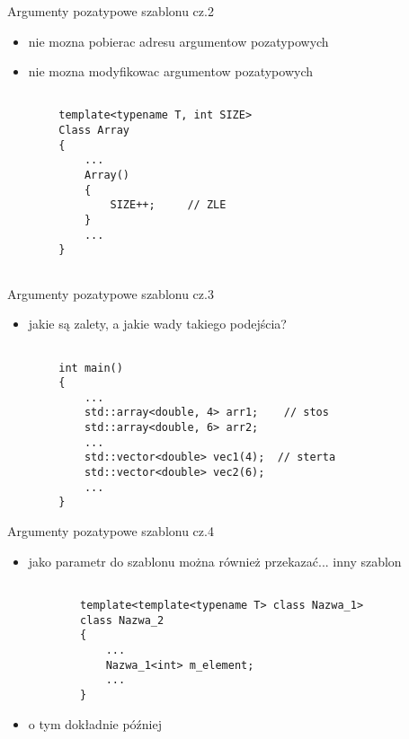 \documentclass[11pt]{beamer}
\begin{document}
\begin{frame}[fragile]{Argumenty pozatypowe szablonu cz.2}
	\begin{itemize}
		\item nie mozna pobierac adresu argumentow pozatypowych
		\item nie mozna modyfikowac argumentow pozatypowych
	\end{itemize}
	
	\begin{lstlisting}[frame=single]  % Start your code-block
		
		template<typename T, int SIZE>
		Class Array 
		{
			...
			Array()
			{
				SIZE++;     // ZLE
			}
			...
		}
		
	\end{lstlisting}

\end{frame}


\begin{frame}[fragile]{Argumenty pozatypowe szablonu cz.3}
	\begin{itemize}
		\item jakie są zalety, a jakie wady takiego podejścia?
	\end{itemize}
	
	\begin{lstlisting}[frame=single]  % Start your code-block
		
		int main()
		{	
			...
			std::array<double, 4> arr1;    // stos
			std::array<double, 6> arr2;
			...
			std::vector<double> vec1(4);  // sterta
			std::vector<double> vec2(6);
			...
		}		
	\end{lstlisting}

\end{frame}



\begin{frame}[fragile]{Argumenty pozatypowe szablonu cz.4}
	\begin{itemize}
		\item jako parametr do szablonu można również przekazać... inny szablon
	
	
	\begin{lstlisting}[frame=single]  % Start your code-block
	
		template<template<typename T> class Nazwa_1>
		class Nazwa_2
		{
			...
			Nazwa_1<int> m_element;
			...
		}
	\end{lstlisting}
	\item o tym dokładnie później
	\end{itemize}
\end{frame}
\end{document}
